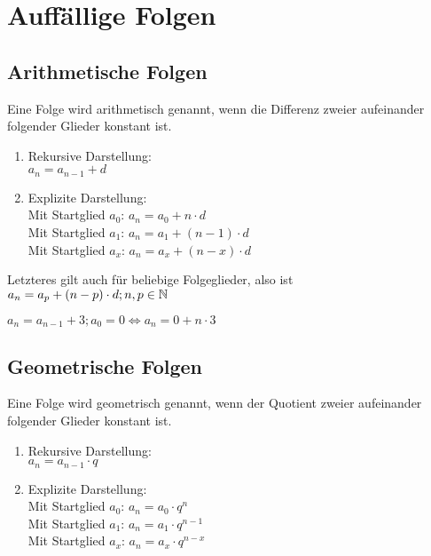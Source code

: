 		\section{Auffällige Folgen}


	\subsection{Arithmetische Folgen}

\begin{Definition}
Eine Folge wird arithmetisch genannt, wenn die Differenz zweier aufeinander folgender Glieder konstant ist.
\begin{enumerate}
\item Rekursive Darstellung:\\
\indent $a_{n}=a_{n-1}+d$
\item Explizite Darstellung:\\
\indent Mit Startglied $a_{0}$: $a_{n}=a_{0}+n\cdot d$\\
\indent Mit Startglied $a_{1}$: $a_{n}=a_{1}+(n-1)\cdot d$\\
\indent Mit Startglied $a_{x}$: $a_{n}=a_{x}+(n-x)\cdot d$
\end{enumerate}
\end{Definition}

\begin{Bemerkung}
Letzteres gilt auch für beliebige Folgeglieder, also ist $a_{n}=a_{p}+(n-p)\cdot d;n,p\in\mathbb{N}$
\end{Bemerkung}

\begin{Beispiel}
$a_{n}=a_{n-1}+3;a_{0}=0\Leftrightarrow a_{n}=0+n\cdot3$
\end{Beispiel}

	\subsection{Geometrische Folgen}

\begin{Definition}
Eine Folge wird geometrisch genannt, wenn der Quotient zweier aufeinander folgender Glieder konstant ist.
\begin{enumerate}
\item Rekursive Darstellung:\\
\indent $a_{n}=a_{n-1}\cdot q$
\item Explizite Darstellung:\\
\indent Mit Startglied $a_{0}$: $a_{n}=a_{0}\cdot q^n$\\
\indent Mit Startglied $a_{1}$: $a_{n}=a_{1}\cdot q^{n-1}$\\
\indent Mit Startglied $a_{x}$: $a_{n}=a_{x}\cdot q^{n-x}$\\
\end{enumerate}
\end{Definition}

